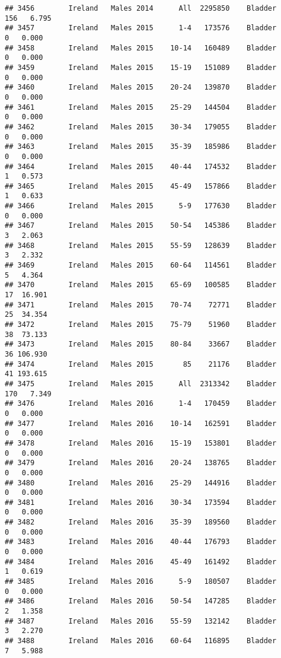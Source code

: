 \documentclass[
]{article}
\begin{document}
\begin{verbatim}
## 3456        Ireland   Males 2014      All  2295850    Bladder    156   6.795
## 3457        Ireland   Males 2015      1-4   173576    Bladder      0   0.000
## 3458        Ireland   Males 2015    10-14   160489    Bladder      0   0.000
## 3459        Ireland   Males 2015    15-19   151089    Bladder      0   0.000
## 3460        Ireland   Males 2015    20-24   139870    Bladder      0   0.000
## 3461        Ireland   Males 2015    25-29   144504    Bladder      0   0.000
## 3462        Ireland   Males 2015    30-34   179055    Bladder      0   0.000
## 3463        Ireland   Males 2015    35-39   185986    Bladder      0   0.000
## 3464        Ireland   Males 2015    40-44   174532    Bladder      1   0.573
## 3465        Ireland   Males 2015    45-49   157866    Bladder      1   0.633
## 3466        Ireland   Males 2015      5-9   177630    Bladder      0   0.000
## 3467        Ireland   Males 2015    50-54   145386    Bladder      3   2.063
## 3468        Ireland   Males 2015    55-59   128639    Bladder      3   2.332
## 3469        Ireland   Males 2015    60-64   114561    Bladder      5   4.364
## 3470        Ireland   Males 2015    65-69   100585    Bladder     17  16.901
## 3471        Ireland   Males 2015    70-74    72771    Bladder     25  34.354
## 3472        Ireland   Males 2015    75-79    51960    Bladder     38  73.133
## 3473        Ireland   Males 2015    80-84    33667    Bladder     36 106.930
## 3474        Ireland   Males 2015       85    21176    Bladder     41 193.615
## 3475        Ireland   Males 2015      All  2313342    Bladder    170   7.349
## 3476        Ireland   Males 2016      1-4   170459    Bladder      0   0.000
## 3477        Ireland   Males 2016    10-14   162591    Bladder      0   0.000
## 3478        Ireland   Males 2016    15-19   153801    Bladder      0   0.000
## 3479        Ireland   Males 2016    20-24   138765    Bladder      0   0.000
## 3480        Ireland   Males 2016    25-29   144916    Bladder      0   0.000
## 3481        Ireland   Males 2016    30-34   173594    Bladder      0   0.000
## 3482        Ireland   Males 2016    35-39   189560    Bladder      0   0.000
## 3483        Ireland   Males 2016    40-44   176793    Bladder      0   0.000
## 3484        Ireland   Males 2016    45-49   161492    Bladder      1   0.619
## 3485        Ireland   Males 2016      5-9   180507    Bladder      0   0.000
## 3486        Ireland   Males 2016    50-54   147285    Bladder      2   1.358
## 3487        Ireland   Males 2016    55-59   132142    Bladder      3   2.270
## 3488        Ireland   Males 2016    60-64   116895    Bladder      7   5.988

\end{verbatim}
\end{document}
